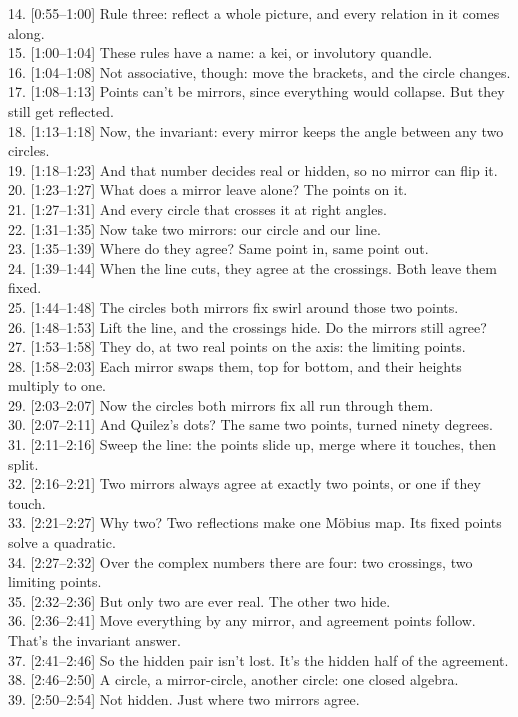 \documentclass[10pt]{article}
\begin{document}
14. [0:55--1:00] Rule three: reflect a whole picture, and every relation in it comes along.\\
15. [1:00--1:04] These rules have a name: a kei, or involutory quandle.\\
16. [1:04--1:08] Not associative, though: move the brackets, and the circle changes.\\
17. [1:08--1:13] Points can't be mirrors, since everything would collapse. But they still get reflected.\\
18. [1:13--1:18] Now, the invariant: every mirror keeps the angle between any two circles.\\
19. [1:18--1:23] And that number decides real or hidden, so no mirror can flip it.\\
20. [1:23--1:27] What does a mirror leave alone? The points on it.\\
21. [1:27--1:31] And every circle that crosses it at right angles.\\
22. [1:31--1:35] Now take two mirrors: our circle and our line.\\
23. [1:35--1:39] Where do they agree? Same point in, same point out.\\
24. [1:39--1:44] When the line cuts, they agree at the crossings. Both leave them fixed.\\
25. [1:44--1:48] The circles both mirrors fix swirl around those two points.\\
26. [1:48--1:53] Lift the line, and the crossings hide. Do the mirrors still agree?\\
27. [1:53--1:58] They do, at two real points on the axis: the limiting points.\\
28. [1:58--2:03] Each mirror swaps them, top for bottom, and their heights multiply to one.\\
29. [2:03--2:07] Now the circles both mirrors fix all run through them.\\
30. [2:07--2:11] And Quilez's dots? The same two points, turned ninety degrees.\\
31. [2:11--2:16] Sweep the line: the points slide up, merge where it touches, then split.\\
32. [2:16--2:21] Two mirrors always agree at exactly two points, or one if they touch.\\
33. [2:21--2:27] Why two? Two reflections make one Möbius map. Its fixed points solve a quadratic.\\
34. [2:27--2:32] Over the complex numbers there are four: two crossings, two limiting points.\\
35. [2:32--2:36] But only two are ever real. The other two hide.\\
36. [2:36--2:41] Move everything by any mirror, and agreement points follow. That's the invariant answer.\\
37. [2:41--2:46] So the hidden pair isn't lost. It's the hidden half of the agreement.\\
38. [2:46--2:50] A circle, a mirror-circle, another circle: one closed algebra.\\
39. [2:50--2:54] Not hidden. Just where two mirrors agree.
\end{document}
